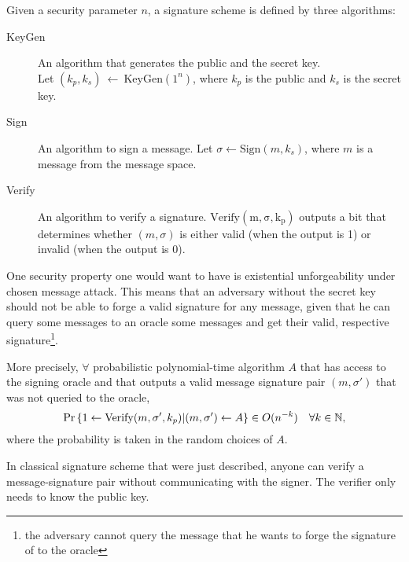 Given a security parameter $n$, a signature scheme is defined by three algorithms:
\begin{description}
    \item[KeyGen] An algorithm that generates the public and the secret key.\\ 
        Let $(k_p,k_s)~\leftarrow~\mathrm{KeyGen}(1^n)$, where $k_p$ is the public and $k_s$ is the secret key.
    \item[Sign] An algorithm to sign a message.
        Let $\sigma \leftarrow \mathrm{Sign}(m,k_s)$, where $m$ is a message from the message space.
    \item[Verify] An algorithm to verify a signature.
        $\mathrm{Verify(m,\sigma,k_p)}$ outputs a bit that determines whether $(m,\sigma)$ 
        is either valid (when the output is 1) or invalid (when the output is 0).
\end{description}

One security property one would want to have is existential unforgeability under chosen message attack.  
This means that an adversary without the secret key should not be able to forge a valid 
signature for any message, given that he can query some messages to an oracle some messages and get their valid, respective
signature\footnote{the adversary cannot query the message that he wants to forge the signature of to the oracle}.

More precisely, $\forall$ probabilistic polynomial-time algorithm $A$ that has access to the signing oracle and that outputs
a valid message signature pair $(m,\sigma')$ that was not queried to the oracle, 
\[
\Pr{\left\{1 \leftarrow \mathrm{Verify}(m,\sigma',k_p) | (m,\sigma') \leftarrow A\right\}} \in O(n^{-k}) \quad \forall k \in \mathbb{N}, 
\]
where the probability is taken in the random choices of $A$.

In classical signature scheme that were just described, anyone can verify a 
message-signature pair without communicating with the signer. The verifier only needs to 
know the public key.
